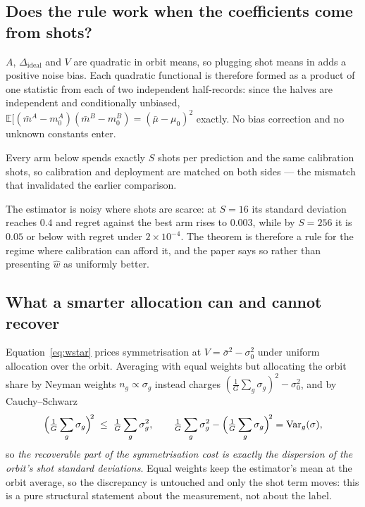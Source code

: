\documentclass{article}
\begin{document}
\subsection{Does the rule work when the coefficients come from shots?}
$A$, $\Delta_{\mathrm{ideal}}$ and $V$ are quadratic in orbit means, so plugging shot means in adds a
positive noise bias. Each quadratic functional is therefore formed as a product of one statistic from
each of two independent half-records: since the halves are independent and conditionally unbiased,
$\mathbb{E}[(\bar m^{A}-m_0^{A})(\bar m^{B}-m_0^{B})=(\bar\mu-\mu_0)^2$ exactly. No bias correction and
no unknown constants enter.

Every arm below spends exactly $S$ shots per prediction and the same calibration shots, so calibration
and deployment are matched on both sides --- the mismatch that invalidated the earlier comparison.




The estimator is noisy where shots are scarce: at $S=16$ its standard deviation reaches $0.4$ and regret
against the best arm rises to $0.003$, while by $S=256$ it is $0.05$ or below with regret under
$2\times10^{-4}$. The theorem is therefore a rule for the regime where calibration can afford it, and
the paper says so rather than presenting $\hat w$ as uniformly better.

\subsection{What a smarter allocation can and cannot recover}
\label{sec:profile}

Equation~\eqref{eq:wstar} prices symmetrisation at $V=\bar\sigma^2-\sigma_0^2$ under uniform
allocation over the orbit. Averaging with equal weights but allocating the orbit share by Neyman
weights $n_g\propto\sigma_g$ instead charges $(\tfrac1G\sum_g\sigma_g)^2-\sigma_0^2$, and by
Cauchy--Schwarz
\begin{equation}
\Bigl(\tfrac1G\sum_g\sigma_g\Bigr)^{\!2}\;\le\;\tfrac1G\sum_g\sigma_g^{2},
\qquad
\tfrac1G\sum_g\sigma_g^{2}-\Bigl(\tfrac1G\sum_g\sigma_g\Bigr)^{\!2}=\mathrm{Var}_g(\sigma),
\end{equation}
so \emph{the recoverable part of the symmetrisation cost is exactly the dispersion of the orbit's
shot standard deviations}. Equal weights keep the estimator's mean at the orbit average, so the
discrepancy is untouched and only the shot term moves: this is a pure structural statement about the
measurement, not about the label.
\end{document}
